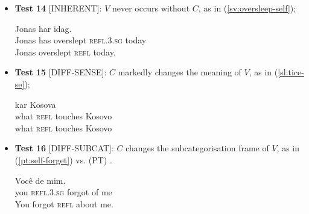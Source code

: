 \documentclass[output=paper,
modfonts,
]{langscibook}
\begin{document}
\begin{itemize}
\item[] \textbf{Test 14} [INHERENT]: $V$ never occurs without $C$, as in (\ref{sv:oversleep-self});

\ea \label{sv:oversleep-self}
\settowidth {}
\gll Jonas har   idag. \\
Jonas has overslept \textsc{refl.3.sg} today\\ 
\glt Jonas overslept \textsc{refl} today. 
\z

\item[] \textbf{Test 15} [DIFF-SENSE]: $C$ markedly changes the meaning of $V$, as in (\ref{sl:tice-se});


\ea \label{sl:tice-se}
\settowidth {}
\gll kar   Kosova \\
what \textsc{refl} touches Kosovo\\ 
\glt what \textsc{refl} touches Kosovo 
\z

\item[] \textbf{Test 16} [DIFF-SUBCAT]: $C$ changes the subcategorisation frame of $V$, as in (\ref{pt:self-forget}) vs.
(PT) .


\ea \label{pt:self-forget}
\settowidth {}
\gll Você   de mim. \\
you \textsc{refl.3.sg} forgot of me\\ 
\glt You forgot \textsc{refl} about me. 
\z

\end{itemize}
\end{document}
